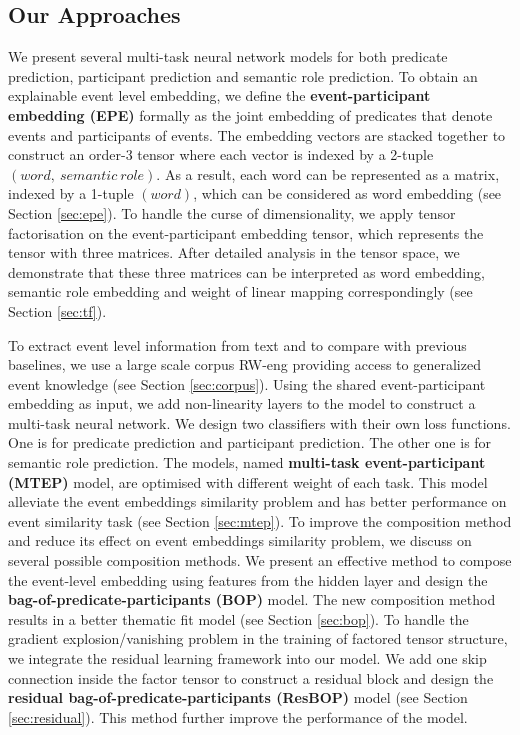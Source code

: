 \documentclass[a4paper]{article}
\begin{document}
\subsection{Our Approaches} \label{sec:approaches}
We present several multi-task neural network models for both predicate prediction, participant prediction and semantic role prediction. To obtain an explainable event level embedding, we define the \textbf{event-participant embedding (EPE)} formally as the joint embedding of predicates that denote events and participants of events. The embedding vectors are stacked together to construct an order-3 tensor where each vector is indexed by a 2-tuple $(word,\ semantic\ role)$. As a result, each word can be represented as a matrix, indexed by a 1-tuple $(word)$, which can be considered as word embedding (see Section \ref{sec:epe}). To handle the curse of dimensionality, we apply tensor factorisation on the event-participant embedding tensor, which represents the tensor with three matrices. After detailed analysis in the tensor space, we demonstrate that these three matrices can be interpreted as word embedding, semantic role embedding and weight of linear mapping correspondingly (see Section \ref{sec:tf}). 

To extract event level information from text and to compare with previous baselines, we use a large scale corpus RW-eng providing access to generalized event knowledge (see Section \ref{sec:corpus}). Using the shared event-participant embedding as input, we add non-linearity layers to the model to construct a multi-task neural network. We design two classifiers with their own loss functions. One is for predicate prediction and participant prediction. The other one is for semantic role prediction. The models, named \textbf{multi-task event-participant (MTEP)} model, are optimised with different weight of each task. This model alleviate the event embeddings similarity problem and has better performance on event similarity task (see Section \ref{sec:mtep}). To improve the composition method and reduce its effect on event embeddings similarity problem, we discuss on several possible composition methods. We present an effective method to compose the event-level embedding using features from the hidden layer and design the \textbf{bag-of-predicate-participants (BOP)} model. The new composition method results in a better thematic fit model (see Section \ref{sec:bop}). To handle the gradient explosion/vanishing problem in the training of factored tensor structure, we integrate the residual learning framework into our model. We add one skip connection inside the factor tensor to construct a residual block and design the \textbf{residual bag-of-predicate-participants (ResBOP)} model (see Section \ref{sec:residual}). This method further improve the performance of the model. 
\end{document}
